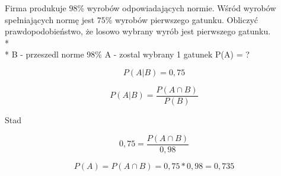 \documentclass{article}
\begin{document}
	
	
	
	Firma produkuje $98$\% wyrobów odpowiadających normie. Wśród wyrobów spełniających normę jest $75$\% wyrobów pierwszego gatunku. Obliczyć prawdopodobieństwo, że losowo wybrany wyrób jest pierwszego gatunku. \\* \\*		
	B - przeszedl norme  98\%  \newline
	A - zostal wybrany 1 gatunek \newline
	P(A) = ?
	
	$$ P(A|B) = 0,75 $$
	
	$$ P(A|B) = \dfrac{P(A \cap B)}{ P(B)} $$
	
	Stad
	
	$$ 0,75 = \dfrac{P(A \cap B)}{0,98} $$
	
	$$ P(A) = P(A \cap B) = 0,75 * 0, 98 = 0,735 $$
	
	
	
	
	
	
	
\end{document}
